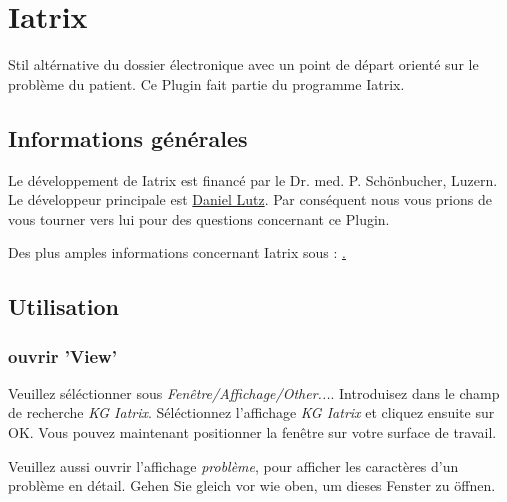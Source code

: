 
\section{Iatrix}\label{Iatrix}
Stil altérnative du dossier électronique avec un point de départ orienté sur le problème du patient. Ce Plugin fait partie du programme Iatrix.

\subsection{Informations générales}

Le développement de Iatrix est financé par le Dr. med. P. Schönbucher, Luzern.
Le développeur principale est  \href{http://www.elexis.ch/jp/component/option,com_contact/task,view/contact_id,2/Itemid,32/}{Daniel Lutz}.
Par conséquent nous vous prions de vous tourner vers lui pour des questions concernant ce Plugin.

Des plus amples informations concernant Iatrix sous : \href{http://www.iatrix.org/}.

\subsection{Utilisation}

\subsubsection{ouvrir 'View' }

Veuillez séléctionner sous  \textit{Fenêtre/Affichage/Other...}. Introduisez dans le champ de recherche
\textit{KG Iatrix}. Séléctionnez l'affichage \textit{KG Iatrix} et cliquez ensuite sur OK. Vous pouvez maintenant positionner la fenêtre sur votre surface de travail.

Veuillez aussi ouvrir l'affichage \textit{problème}, pour afficher les caractères d'un problème en détail. Gehen Sie gleich vor wie oben, um dieses Fenster
zu öffnen.

